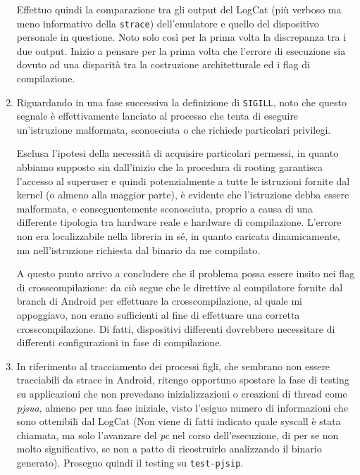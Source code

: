 \begin{enumerate}
       Effettuo quindi la comparazione tra gli output del LogCat (più verboso ma
       meno informativo della \texttt{\small strace}) dell'emulatore e quello del dispositivo 
       personale in questione. Noto solo così per la prima volta la discrepanza
       tra i due output. Inizio a pensare per la prima volta che l'errore di esecuzione
       sia dovuto ad una disparità tra la costruzione architetturale ed i flag
       di compilazione.
\item Riguardando in una fase successiva la definizione di \texttt{\small SIGILL}, noto che
       questo segnale è effettivamente lanciato al processo che tenta di eseguire
       un'istruzione malformata, sconosciuta o che richiede particolari privilegi.
       
       Esclusa  l'ipotesi della necessità di acquisire particolari permessi,
       in quanto abbiamo supposto sin dall'inizio che la procedura di rooting
       garantisca l'accesso al superuser e quindi potenzialmente a tutte le istruzioni
       fornite dal kernel (o almeno alla maggior parte), è evidente che l'istruzione
       debba essere malformata, e conseguentemente sconosciuta, proprio a causa
       di una differente tipologia tra hardware reale e hardware di compilazione.
       L'errore non era localizzabile nella libreria in sé, in quanto caricata 
       dinamicamente, ma nell'istruzione richiesta dal binario da me compilato.
       
       A questo punto arrivo a concludere che il problema possa essere insito 
       nei flag di crosscompilazione: da ciò segue che le direttive al compilatore
       fornite dal branch di Android per effettuare la crosscompilazione, al
       quale mi appoggiavo, non erano sufficienti al fine di effettuare una corretta
       crosscompilazione. Di fatti, dispositivi differenti dovrebbero necessitare
       di differenti configurazioni in fase di compilazione.
\item In riferimento al tracciamento dei processi figli, che sembrano non essere
	tracciabili da strace in Android, ritengo opportuno spostare la fase
	di testing su applicazioni che non prevedano inizializzazioni o creazioni
	di thread come \textit{\small pjsua}, almeno per una fase iniziale, visto l'esiguo
	numero di informazioni che sono ottenibili dal LogCat (Non viene di
	fatti indicato quale syscall è stata chiamata, ma solo l'avanzare del \textit{\small pc}
	nel corso dell'esecuzione, di per se non molto significativo, se non a patto
	di ricostruirlo analizzando il binario generato). Proseguo quindi il testing
	su \texttt{\small test-pjsip}.
	

\end{enumerate}
